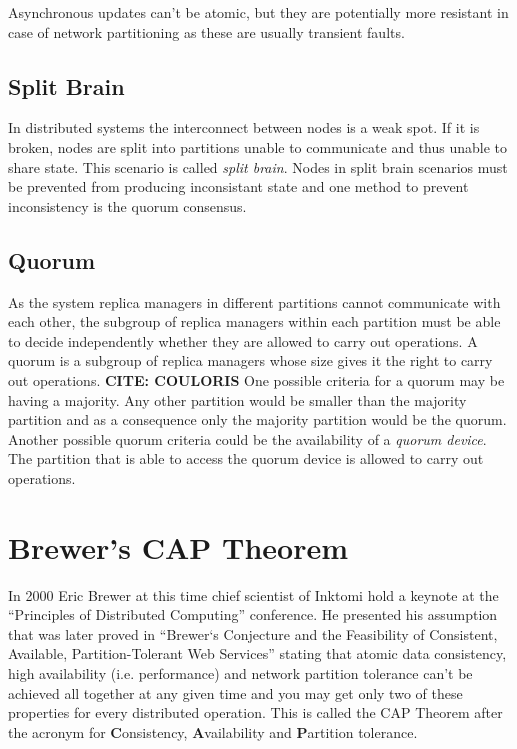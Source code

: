Asynchronous updates can't be atomic, but they are potentially more
resistant in case of network partitioning as these are usually
transient faults.

\subsection{Split Brain}

In distributed systems the interconnect between nodes is a weak
spot. If it is broken, nodes are split into partitions unable to
communicate and thus unable to share state. This scenario is called
\emph{split brain}. Nodes in split brain scenarios must be
prevented from producing inconsistant state and one method to
prevent inconsistency is the quorum consensus.

\subsection{Quorum}

As the system replica managers in different partitions cannot
communicate with each other, the subgroup of replica managers
within each partition must be able to decide independently whether
they are allowed to carry out operations. A quorum is a subgroup of
replica managers whose size gives it the right to carry out
operations. \textbf{CITE: COULORIS} One possible criteria for a
quorum may be having a majority. Any other partition would be
smaller than the majority partition and as a consequence only the
majority partition would be the quorum. Another possible quorum
criteria could be the availability of a \emph{quorum device}. The
partition that is able to access the quorum device is allowed to
carry out operations.

\section{Brewer's CAP Theorem}

In 2000 Eric Brewer at this time chief scientist of Inktomi hold a
keynote at the ``Principles of Distributed Computing'' conference.
He presented his assumption that was later proved in
``Brewer‘s Conjecture and the Feasibility of Consistent, Available, Partition-Tolerant Web Services''
stating that atomic data consistency, high availability (i.e.
performance) and network partition tolerance can't be achieved all
together at any given time and you may get only two of these
properties for every distributed operation. This is called the CAP
Theorem after the acronym for \textbf{C}onsistency,
\textbf{A}vailability and \textbf{P}artition tolerance.

